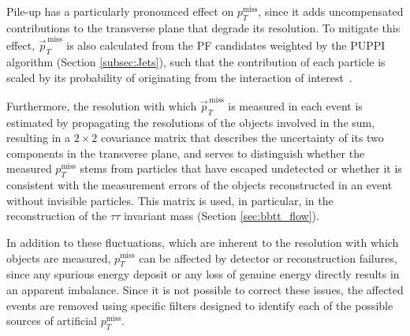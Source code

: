 \medskip

Pile-up has a particularly pronounced effect on $p_T^\text{miss}$, since it adds uncompensated contributions to the transverse plane that degrade its resolution. To mitigate this effect, $\vec{p}_T^{\,\text{miss}}$ is also calculated from the PF candidates weighted by the PUPPI algorithm (Section \ref{subsec:Jets}), such that the contribution of each particle is scaled by its probability of originating from the interaction of interest~\cite{CMS:2019ctu, Bertolini:2014bba}.

Furthermore, the resolution with which $\vec{p}_T^{\,\text{miss}}$ is measured in each event is estimated by propagating the resolutions of the objects involved in the sum, resulting in a $2\times2$ covariance matrix that describes the uncertainty of its two components in the transverse plane, and serves to distinguish whether the measured $p_T^\text{miss}$ stems from particles that have escaped undetected or whether it is consistent with the measurement errors of the objects reconstructed in an event without invisible particles. This matrix is used, in particular, in the reconstruction of the $\tau\tau$ invariant mass (Section \ref{sec:bbtt_flow}).

In addition to these fluctuations, which are inherent to the resolution with which objects are measured, $p_T^\text{miss}$ can be affected by detector or reconstruction failures, since any spurious energy deposit or any loss of genuine energy directly results in an apparent imbalance. Since it is not possible to correct these issues, the affected events are removed using specific filters designed to identify each of the possible sources of artificial $p_T^\text{miss}$.\bigskip


